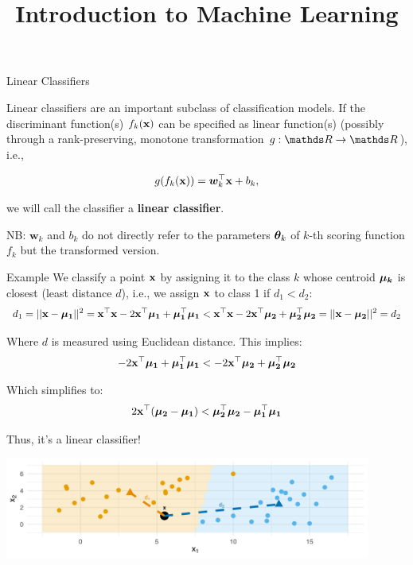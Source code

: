 \documentclass[11pt,compress,t,notes=noshow, xcolor=table]{beamer}
\title{Introduction to Machine Learning}
\begin{document}

\framebreak


\begin{vbframe}{Linear Classifiers}

Linear classifiers are an important subclass of classification models. 
If the discriminant function(s) $\fkx$ can be specified as linear function(s) (possibly through a rank-preserving,
monotone transformation $g: \R \to \R$), i.e., 

$$
  g(\fkx) = \bm{w}_k^\top \xv + b_k,
$$

we will call the classifier a \textbf{linear classifier}. 

\vfill

NB: $\bm{w}_k$ and $b_k$ do not directly refer to the parameters $\thetav_k$ 
of $k$-th scoring function $f_k$ but the transformed version. 

\end{vbframe}

\begin{vbframe}{Example}
We classify a point $\xv$ by assigning it to the class $k$ whose centroid $\muk$ is closest (least distance $d$), i.e., we assign $\xv$ to class 1 if $d_1 < d_2$:
$$
d_1 = ||\xv - \muk[1]||^2 = \xv^\top \xv - 2 \xv^\top \muk[1] + \muk[1]^\top \muk[1]
< \xv^\top \xv - 2 \xv^\top \muk[2] + \muk[2]^\top \muk[2] = ||\xv - \muk[2]||^2 = d_2
$$

Where $d$ is measured using Euclidean distance. This implies:
$$
-2 \xv^\top \muk[1] + \muk[1]^\top \muk[1]
< -2 \xv^\top \muk[2] + \muk[2]^\top \muk[2]
$$

Which simplifies to:
$$
2 \xv^\top (\muk[2] - \muk[1]) < \muk[2]^\top \muk[2] - \muk[1]^\top \muk[1]
$$

Thus, it's a linear classifier!
\vspace{-0.85em}
\begin{center}
\includegraphics[width=0.9\textwidth]{figure/nearest_centroid_classifier.png} 
\end{center}

\end{vbframe}
  
\end{document}
